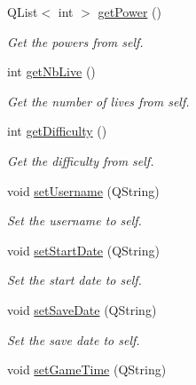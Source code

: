 \begin{DoxyCompactItemize}
Q\+List$<$ int $>$ \hyperlink{class_g___profil_a69e82b14ea2a56072310cea7e2884012}{get\+Power} ()
\begin{DoxyCompactList}\small\item\em Get the powers from self. \end{DoxyCompactList}\item 
int \hyperlink{class_g___profil_aa92b75fa285554c0a1e663df998f6eaf}{get\+Nb\+Live} ()
\begin{DoxyCompactList}\small\item\em Get the number of lives from self. \end{DoxyCompactList}\item 
int \hyperlink{class_g___profil_a1330ee38448a9fc1332cd79679fe507e}{get\+Difficulty} ()
\begin{DoxyCompactList}\small\item\em Get the difficulty from self. \end{DoxyCompactList}\item 
\hypertarget{class_g___profil_a987a8a9111c2cb0be8265ab847bd534f}{}void \hyperlink{class_g___profil_a987a8a9111c2cb0be8265ab847bd534f}{set\+Username} (Q\+String)\label{class_g___profil_a987a8a9111c2cb0be8265ab847bd534f}

\begin{DoxyCompactList}\small\item\em Set the username to self. \end{DoxyCompactList}\item 
\hypertarget{class_g___profil_a5ec2b8a8a1e5c14224a2d149e1b2685b}{}void \hyperlink{class_g___profil_a5ec2b8a8a1e5c14224a2d149e1b2685b}{set\+Start\+Date} (Q\+String)\label{class_g___profil_a5ec2b8a8a1e5c14224a2d149e1b2685b}

\begin{DoxyCompactList}\small\item\em Set the start date to self. \end{DoxyCompactList}\item 
\hypertarget{class_g___profil_a82a71725cc40e404297395018ac86139}{}void \hyperlink{class_g___profil_a82a71725cc40e404297395018ac86139}{set\+Save\+Date} (Q\+String)\label{class_g___profil_a82a71725cc40e404297395018ac86139}

\begin{DoxyCompactList}\small\item\em Set the save date to self. \end{DoxyCompactList}\item 
\hypertarget{class_g___profil_a3ccb29d272e95ec42b8367e34ac8eaf5}{}void \hyperlink{class_g___profil_a3ccb29d272e95ec42b8367e34ac8eaf5}{set\+Game\+Time} (Q\+String)\label{class_g___profil_a3ccb29d272e95ec42b8367e34ac8eaf5}


\end{DoxyCompactItemize}
